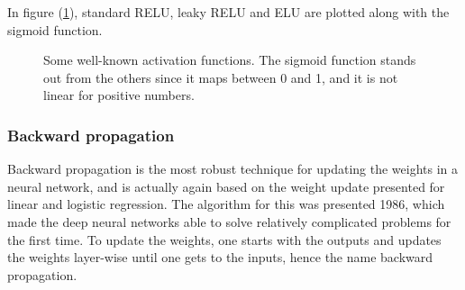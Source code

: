 In figure (\ref{fig:activation_functions}), standard RELU, leaky RELU and ELU are plotted along with the sigmoid function.

\begin{figure}
	\centering
	\caption{Some well-known activation functions. The sigmoid function stands out from the others since it maps between 0 and 1, and it is not linear for positive numbers.}%
	\label{fig:activation_functions}%
\end{figure}


\subsubsection{Backward propagation} \label{sec:backward}
Backward propagation is the most robust technique for updating the weights in a neural network, and is actually again based on the weight update presented for linear and logistic regression. The algorithm for this was presented 1986, which made the deep neural networks able to solve relatively complicated problems for the first time. \cite{rumelhart_learning_1986} To update the weights, one starts with the outputs and updates the weights layer-wise until one gets to the inputs, hence the name backward propagation. 


